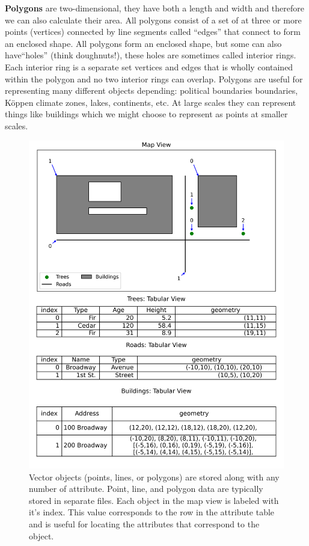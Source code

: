 \documentclass[
]{book}
\begin{document}
\textbf{Polygons} are two-dimensional, they have both a length and width and therefore we can also calculate their area. All polygons consist of a set of at three or more points (vertices) connected by line segments called ``edges'' that connect to form an enclosed shape. All polygons form an enclosed shape, but some can also have``holes'' (think doughnuts!), these holes are sometimes called interior rings. Each interior ring is a separate set vertices and edges that is wholly contained within the polygon and no two interior rings can overlap. Polygons are useful for representing many different objects depending: political boundaries boundaries, Köppen climate zones, lakes, continents, etc. At large scales they can represent things like buildings which we might choose to represent as points at smaller scales.

\begin{figure}
\centering
\includegraphics{images/03-vector-model.png}
\caption{Vector objects (points, lines, or polygons) are stored along with any number of attribute. Point, line, and polygon data are typically stored in separate files. Each object in the map view is labeled with it's index. This value corresponds to the row in the attribute table and is useful for locating the attributes that correspond to the object.}
\end{figure}
\end{document}
